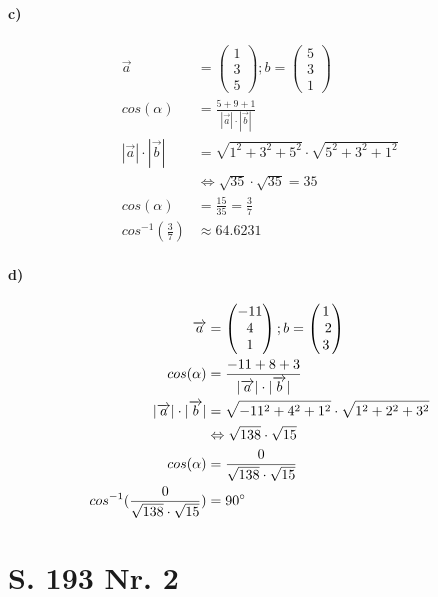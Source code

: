 \documentclass[12pt,a4paper]{report}
\begin{document}
	\paragraph{c)}
	\begin{align*}
		\overrightarrow a &= \begin{pmatrix}
			1 \\ 3 \\ 5
		\end{pmatrix}; b = \begin{pmatrix}
			5 \\ 3 \\ 1
		\end{pmatrix} \\
		cos(\alpha) &= \frac{5 + 9 + 1}{|\overrightarrow a| \cdot |\overrightarrow b|} \\
		|\overrightarrow a| \cdot |\overrightarrow b| &= \sqrt{1^2+3^2+5^2} \cdot \sqrt{5^2+3^2+1^2} \\
		&\Leftrightarrow \sqrt{35} \cdot \sqrt{35} = 35 \\
		cos(\alpha) &= \frac{15}{35} = \frac{3}{7} \\
		cos^{-1}(\frac{3}{7}) &\approx 64.6231
	\end{align*}
	\paragraph{d)}
	\begin{align*}
		\overrightarrow a &= \begin{pmatrix}
			-11 \\ 4 \\ 1
		\end{pmatrix}; b = \begin{pmatrix}
			1 \\ 2 \\ 3
		\end{pmatrix} \\
		cos(\alpha) &= \frac{-11 + 8 + 3}{|\overrightarrow a| \cdot |\overrightarrow b|} \\
		|\overrightarrow a| \cdot |\overrightarrow b| &= \sqrt{-11^2 + 4^2 + 1^2} \cdot \sqrt{1^2 + 2^2 + 3^2} \\
		&\Leftrightarrow \sqrt{138} \cdot \sqrt{15} \\
		cos(\alpha) &= \frac{0}{\sqrt{138} \cdot \sqrt{15}} \\
		cos^{-1}(\frac{0}{\sqrt{138} \cdot \sqrt{15}}) &= 90\degree
	\end{align*}
	\section{S. 193 Nr. 2}
\end{document}
